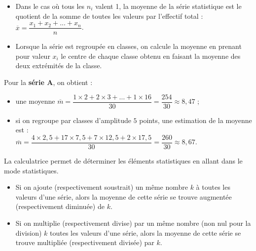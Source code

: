 \begin{remarque}
   \begin{itemize}
      \item Dans le cas où tous les $n_i$ valent 1,  la moyenne de la série statistique est le quotient de la somme de toutes les valeurs par l'effectif total : $\overline{x}=\dfrac{x_1+x_2+...+x_n}{n}$. \smallskip
      \item Lorsque la série est regroupée en classes, on calcule la moyenne en prenant pour valeur $x_i$ le centre de chaque classe obtenu en faisant la moyenne des deux extrémités de la classe.
   \end{itemize}
\end{remarque}

\smallskip

\begin{exemple*1}
   Pour la {\bf série A}, on obtient :
   \smallskip
   \begin{itemize}
     \item une moyenne $\overline{m} =\dfrac{1\times2+2\times3+\dots+1\times16}{30} =\dfrac{254}{30} \approx 8,47$ ; 
     \medskip
     \item si on regroupe par classes d'amplitude $5$ points, une estimation de la moyenne est : \\ [1mm]
       $\overline{m} =\dfrac{4\times2,5+17\times7,5+7\times12,5+2\times17,5}{30} =\dfrac{260}{30}\approx 8,67$. \\ [-8mm]
   \end{itemize}
\end{exemple*1}

   \medskip
   
   La calculatrice permet de déterminer les éléments statistiques en allant dans le mode statistiques.

\begin{propriete}
   \begin{itemize}
      \item Si on ajoute (respectivement soustrait) un même nombre $k$ à toutes les valeurs d'une série, alors la moyenne de cette série se trouve augmentée (respectivement diminuée) de $k$.
      \item Si on multiplie (respectivement divise) par un même nombre (non nul pour la division) $k$ toutes les valeurs d'une série, alors la moyenne de cette série se trouve multipliée (respectivement divisée) par $k$. \\ [-7mm]
   \end{itemize}
\end{propriete}

